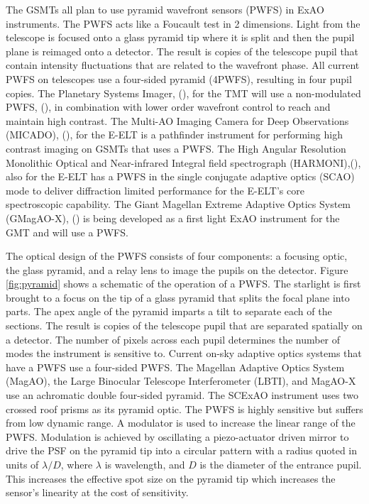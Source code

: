The GSMTs all plan to use pyramid wavefront sensors (PWFS) in ExAO instruments. The PWFS acts like a Foucault test in 2 dimensions. Light from the telescope is focused onto a glass pyramid tip where it is split and then the pupil plane is reimaged onto a detector. The result is copies of the telescope pupil that contain intensity fluctuations that are related to the wavefront phase. All current PWFS on telescopes use a four-sided pyramid (4PWFS), resulting in four pupil copies. The Planetary Systems Imager, (\cite{fitzgerald2019planetary}), for the TMT will use a non-modulated PWFS, (\cite{guyon2018wavefront}), in combination with lower order wavefront control to reach and maintain high contrast. The Multi-AO Imaging Camera for Deep Observations (MICADO), (\cite{davies2018micado}), for the E-ELT is a pathfinder instrument for performing high contrast imaging on GSMTs that uses a PWFS. The High Angular Resolution Monolithic Optical and Near-infrared Integral field spectrograph (HARMONI),(\cite{neichel2016adaptive}), also for the E-ELT has a PWFS in the single conjugate adaptive optics (SCAO) mode to deliver diffraction limited performance for the E-ELT's core spectroscopic capability. The Giant Magellan Extreme Adaptive Optics System (GMagAO-X), (\cite{males2019gmagao}) is being developed as a first light ExAO instrument for the GMT and will use a PWFS. 


The optical design of the PWFS consists of four components: a focusing optic, the glass pyramid, and a relay lens to image the pupils on the detector.\cite{ragazzoni2002pyramid} Figure \ref{fig:pyramid} shows a schematic of the operation of a PWFS.  The starlight is first brought to a focus on the tip of a glass pyramid that splits the focal plane into parts. The apex angle of the pyramid imparts a tilt to separate each of the sections. The result is copies of the telescope pupil that are separated spatially on a detector. The number of pixels across each pupil determines the number of modes the instrument is sensitive to. Current on-sky adaptive optics systems that have a PWFS use a four-sided PWFS. The Magellan Adaptive Optics System (MagAO)\cite{close2018status}, the Large Binocular Telescope Interferometer (LBTI)\cite{esposito2011adaptive}, and MagAO-X use an achromatic double four-sided pyramid. The SCExAO instrument uses two crossed roof prisms as its pyramid optic. The PWFS is highly sensitive but suffers from low dynamic range. A modulator is used to increase the linear range of the PWFS. Modulation is achieved by oscillating a piezo-actuator driven mirror to drive the PSF on the pyramid tip into a circular pattern with a radius quoted in units of $\lambda/D$, where $\lambda$ is wavelength, and $D$ is the diameter of the entrance pupil. This increases the effective spot size on the pyramid tip which increases the sensor's linearity at the cost of sensitivity.\cite{guyon2005}  

